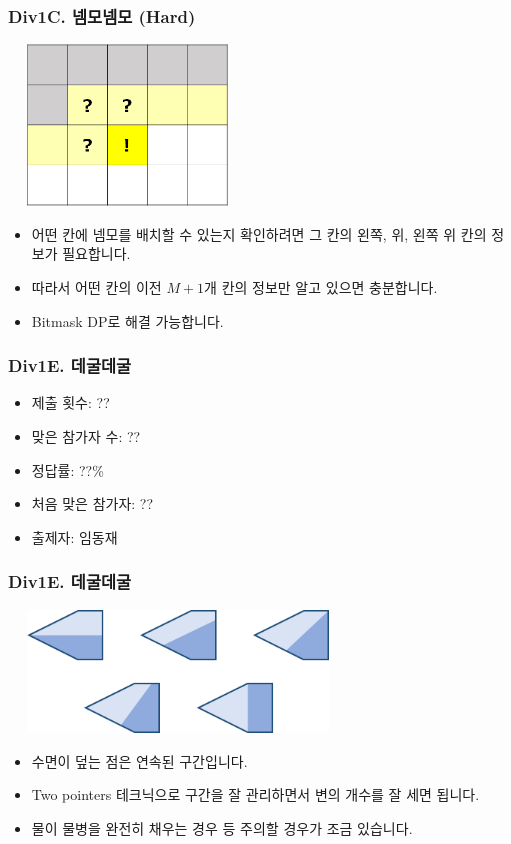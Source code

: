 \documentclass[xetex]{beamer}
\begin{document}
\begin{frame}
  \frametitle{Div1C. 넴모넴모 (Hard)}
  \begin{center}
    \includegraphics[width=0.4\textwidth]{nemo2-sol.png}
  \end{center}
  \begin{itemize}
    \item 어떤 칸에 넴모를 배치할 수 있는지 확인하려면 그 칸의 왼쪽, 위, 왼쪽 위 칸의 정보가 필요합니다.
    \item 따라서 어떤 칸의 이전 $M + 1$개 칸의 정보만 알고 있으면 충분합니다.
    \item Bitmask DP로 해결 가능합니다.
  \end{itemize}
\end{frame}

\begin{frame}
  \frametitle{Div1E. 데굴데굴}
  \begin{itemize}
    \item 제출 횟수: ??
    \item 맞은 참가자 수: ??
    \item 정답률: ??\%
    \item 처음 맞은 참가자: ??
    \item 출제자: 임동재
  \end{itemize}
\end{frame}

\begin{frame}
  \frametitle{Div1E. 데굴데굴}
  \begin{center}
    \includegraphics[width=0.6\textwidth]{roll-sol.png}
  \end{center}
  \begin{itemize}
    \item 수면이 덮는 점은 연속된 구간입니다.
    \item Two pointers 테크닉으로 구간을 잘 관리하면서 변의 개수를 잘 세면 됩니다.
    \item 물이 물병을 완전히 채우는 경우 등 주의할 경우가 조금 있습니다.
  \end{itemize}
\end{frame}
\end{document}
